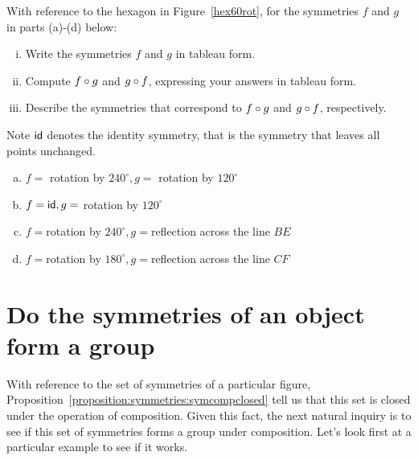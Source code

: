 \begin{exercise}{16}
With reference to the hexagon in Figure~\ref{hex60rot}, for the symmetries $f$ and $g$ in parts (a)-(d) below:
\begin{enumerate}[(i)]
\item
Write the symmetries $f$ and $g$ in tableau form.
\item
Compute $f \circ g$ and $g \circ f$, expressing your answers in tableau form.
\item 
Describe the symmetries that correspond to $f \circ g$ and $g \circ f$, respectively.
\end{enumerate}
\medskip

\noindent
Note ${\sf{i}d}$ denotes the identity symmetry, that is the symmetry that leaves all points unchanged.
\medskip

\begin{enumerate}[(a)]
\item
$f=$ rotation by $240^\circ, g=$ rotation by $120^\circ$
\item
$f={\sf{i}d}, g=$ rotation by $120^\circ$
\item
$f=$rotation by $ 240^\circ, g=$reflection across the line $BE$
\item 
$f=$rotation by $ 180^\circ, g=$reflection across the line $CF$
\end{enumerate}
\end{exercise}

\section{Do the symmetries of an object form a group\quad
{}}\label{SymmetryGroup}

With reference to the set of symmetries of a particular figure,  Proposition~\ref{proposition:symmetries:symcompclosed} tell us that this set is closed under the operation of composition. Given this fact, the next natural inquiry is to see if this set of symmetries forms a group under composition.  Let's look first at a particular example to see if it works.

